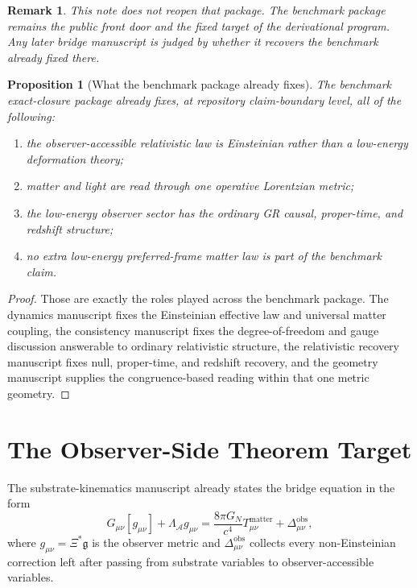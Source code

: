 \documentclass[11pt]{article}
\newcommand{\Sub}{\mathcal{A}}
\newcommand{\BridgeMetric}{\mathfrak{g}}
\newcommand{\ObserverCorr}{\Delta_{\mu\nu}^{\mathrm{obs}}}
\newcommand{\ObserverMetric}{g_{\mu\nu}}
\newtheorem{proposition}{Proposition}
\newtheorem{remark}{Remark}
\begin{document}
\begin{remark}
This note does not reopen that package. The benchmark package remains the public front door and the fixed target of the derivational program. Any later bridge manuscript is judged by whether it recovers the benchmark already fixed there.
\end{remark}

\begin{proposition}[What the benchmark package already fixes]
The benchmark exact-closure package already fixes, at repository claim-boundary level, all of the following:
\begin{enumerate}
    \item the observer-accessible relativistic law is Einsteinian rather than a low-energy deformation theory;
    \item matter and light are read through one operative Lorentzian metric;
    \item the low-energy observer sector has the ordinary GR causal, proper-time, and redshift structure;
    \item no extra low-energy preferred-frame matter law is part of the benchmark claim.
\end{enumerate}
\end{proposition}

\begin{proof}
Those are exactly the roles played across the benchmark package. The dynamics manuscript fixes the Einsteinian effective law and universal matter coupling, the consistency manuscript fixes the degree-of-freedom and gauge discussion answerable to ordinary relativistic structure, the relativistic recovery manuscript fixes null, proper-time, and redshift recovery, and the geometry manuscript supplies the congruence-based reading within that one metric geometry.
\end{proof}

\section{The Observer-Side Theorem Target}

The substrate-kinematics manuscript already states the bridge equation in the form
\begin{equation}
G_{\mu\nu}[\ObserverMetric]
+ \Lambda_{\Sub}\ObserverMetric
=
\frac{8\pi G_N}{c^4}T_{\mu\nu}^{\mathrm{matter}}
+ \ObserverCorr,
\label{eq:bridge}
\end{equation}
where \(\ObserverMetric=\Xi^\ast\BridgeMetric\) is the observer metric and \(\ObserverCorr\) collects every non-Einsteinian correction left after passing from substrate variables to observer-accessible variables.
\end{document}
